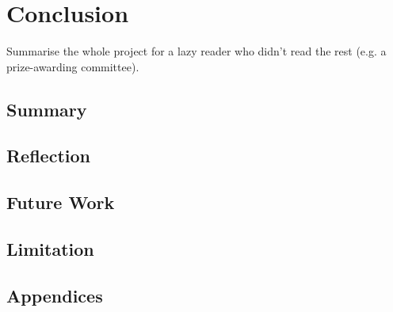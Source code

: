 \documentclass{l4proj}
\begin{document}
\chapter{Conclusion}    
Summarise the whole project for a lazy reader who didn't read the rest (e.g. a prize-awarding committee).
\section{Summary}
\section{Reflection}
\section{Future Work}
\section{Limitation}

%
% 

\begin{appendices}
\chapter{Appendices}
\end{appendices}






\end{document}
